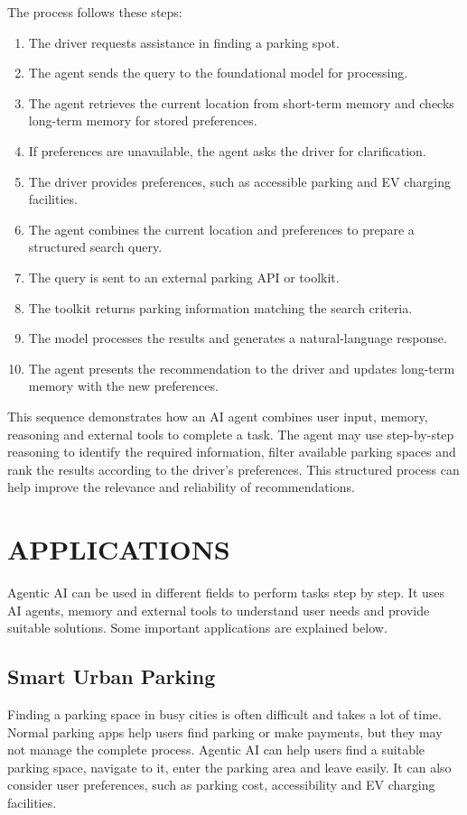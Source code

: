 \documentclass[12pt,a4paper]{report}
\begin{document}
The process follows these steps:
\begin{enumerate}[leftmargin=*]
  \item The driver requests assistance in finding a parking spot.
  \item The agent sends the query to the foundational model for processing.
  \item The agent retrieves the current location from short-term memory and checks long-term memory for stored preferences.
  \item If preferences are unavailable, the agent asks the driver for clarification.
  \item The driver provides preferences, such as accessible parking and EV charging facilities.
  \item The agent combines the current location and preferences to prepare a structured search query.
  \item The query is sent to an external parking API or toolkit.
  \item The toolkit returns parking information matching the search criteria.
  \item The model processes the results and generates a natural-language response.
  \item The agent presents the recommendation to the driver and updates long-term memory with the new preferences.
\end{enumerate}

This sequence demonstrates how an AI agent combines user input, memory, reasoning and external tools to complete a task. The agent may use step-by-step reasoning to identify the required information, filter available parking spaces and rank the results according to the driver's preferences. This structured process can help improve the relevance and reliability of recommendations.

\chapter{APPLICATIONS}
Agentic AI can be used in different fields to perform tasks step by step. It uses AI agents, memory and external tools to understand user needs and provide suitable solutions. Some important applications are explained below.

\section{Smart Urban Parking}
Finding a parking space in busy cities is often difficult and takes a lot of time. Normal parking apps help users find parking or make payments, but they may not manage the complete process. Agentic AI can help users find a suitable parking space, navigate to it, enter the parking area and leave easily. It can also consider user preferences, such as parking cost, accessibility and EV charging facilities.
\end{document}

